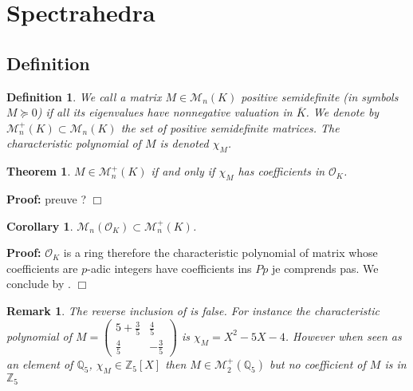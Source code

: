 \documentclass[a4paper,12pt]{article}
\newenvironment{proof}{\hbox{}\vspace{-0.8cm} {\bf Proof:}}{\hfill $\Box$}
\newtheorem{theorem}{Theorem}[section]
\newtheorem{corollary}{Corollary}
\newtheorem{definition}{Definition}
\newtheorem{remark}{Remark}
\newcommand{\simone}[1]{{\color{blue} #1}} %
\newcommand{\OK}{\mathcal{O}_K}
\begin{document}
\section{Spectrahedra}

\subsection{Definition}
\newcommand\Mat{Positive semidefinite matrix }
\newcommand\mats{positive semidefinite matrices }
\newcommand\Mats{positive semidefinite matrices }

\begin{definition}
  We call a matrix $M \in \mathcal{M}_n(K)$ \emph{positive semidefinite} (in symbols $M \succeq 0$)
  if all its eigenvalues have nonnegative valuation in $\overline{K}$.
  We denote by $\mathcal{M}_n^+(K) \subset \mathcal{M}_n(K)$ the set of positive semidefinite matrices.
  The characteristic polynomial of $M$ is denoted $\chi_M$.
\end{definition}

\begin{theorem}
  \label{caracsdp}
  $M \in \mathcal{M}_n^+(K)$ if and only if $\chi_M$ has coefficients in $\OK$.
\end{theorem}
\begin{proof}
  \simone{preuve ?}
\end{proof}

\begin{corollary}\label{cor_caracsdp}
  $\mathcal{M}_n(\OK) \subset \mathcal{M}_n^+(K)$.
\end{corollary}
\begin{proof}
$\OK$ is a ring therefore the characteristic polynomial of matrix whose coefficients are $p$-adic integers have coefficients ins $Pp$ \simone{je comprends pas}. We conclude by .
\end{proof}

\begin{remark}
  The reverse inclusion of  is false. For instance the characteristic polynomial of
  $M = \left(\begin{smallmatrix} 5 + \frac{3}{5} & \frac{4}{5} \\ \frac{4}{5} & -\frac{3}{5} \end{smallmatrix}\right)$ is $\chi_M = X^2-5X-4$. However when seen as an element of $\mathbb{Q}_5$, $\chi_M \in \mathbb{Z}_5[X]$ then $M \in \mathcal{M}_2^+\left( \mathbb{Q}_5 \right)$ but no coefficient of $M$ is in $\mathbb{Z}_5 $
\end{remark}
\end{document}
